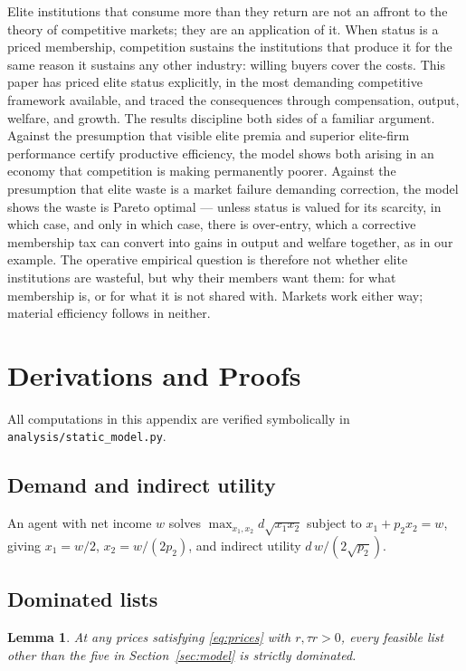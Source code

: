 \documentclass[12pt,letterpaper]{article}
\newtheorem{lemma}{Lemma}
\theoremstyle{definition}
\begin{document}
Elite institutions that consume more than they return are not an affront to the theory of competitive markets; they are an application of it.
When status is a priced membership, competition sustains the institutions that produce it for the same reason it sustains any other industry: willing buyers cover the costs.
This paper has priced elite status explicitly, in the most demanding competitive framework available, and traced the consequences through compensation, output, welfare, and growth.
The results discipline both sides of a familiar argument.
Against the presumption that visible elite premia and superior elite-firm performance certify productive efficiency, the model shows both arising in an economy that competition is making permanently poorer.
Against the presumption that elite waste is a market failure demanding correction, the model shows the waste is Pareto optimal --- unless status is valued for its scarcity, in which case, and only in which case, there is over-entry, which a corrective membership tax can convert into gains in output and welfare together, as in our example.
The operative empirical question is therefore not whether elite institutions are wasteful, but why their members want them: for what membership is, or for what it is not shared with.
Markets work either way; material efficiency follows in neither.

\appendix

\section{Derivations and Proofs}\label{app:derivations}

All computations in this appendix are verified symbolically in \texttt{analysis/static\_model.py}.

\subsection{Demand and indirect utility}
An agent with net income $w$ solves $\max_{x_1,x_2} d\sqrt{x_1x_2}$ subject to $x_1+p_2x_2=w$, giving $x_1=w/2$, $x_2=w/(2p_2)$, and indirect utility $d\,w/(2\sqrt{p_2})$.

\subsection{Dominated lists}
\begin{lemma}\label{lem:dominated} At any prices satisfying \eqref{eq:prices} with $r,\tau r>0$, every feasible list other than the five in Section~\ref{sec:model} is strictly dominated.
\end{lemma}
\end{document}
